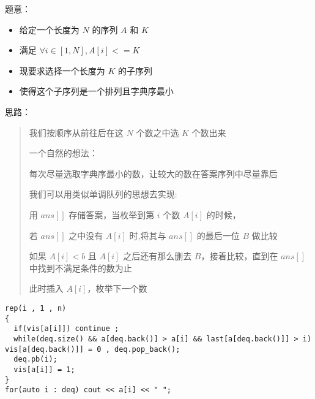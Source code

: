 \documentclass[E:/GsjzTle/main/main.tex]{subfiles}
\begin{document}
题意：
\begin{itemize}
\item
  给定一个长度为 \(N\) 的序列 \(A\) 和 \(K\)
\item
  满足 \(\forall i \in[1 , N],A[i] <= K\)
\item
  现要求选择一个长度为 \(K\) 的子序列
\item
  使得这个子序列是一个排列且字典序最小
\end{itemize}
思路：
\begin{quote}
我们按顺序从前往后在这 \(N\) 个数之中选 \(K\) 个数出来

一个自然的想法：

每次尽量选取字典序最小的数，让较大的数在答案序列中尽量靠后

我们可以用类似单调队列的思想去实现:

用 \(ans[]\) 存储答案，当枚举到第 \(i\) 个数 \(A[i]\) 的时候，

若 \(ans[]\) 之中没有 \(A[i]\) 时,将其与 \(ans[]\) 的最后一位 \(B\)
做比较

如果 \(A[i] < b\) 且 \(A[i]\) 之后还有那么删去 \(B\)，接着比较，直到在
\(ans[]\) 中找到不满足条件的数为止

此时插入 \(A[i]\)，枚举下一个数
\end{quote}

\begin{lstlisting}
rep(i , 1 , n) 
{
  if(vis[a[i]]) continue ;
  while(deq.size() && a[deq.back()] > a[i] && last[a[deq.back()]] > i) vis[a[deq.back()]] = 0 , deq.pop_back();   
  deq.pb(i);
  vis[a[i]] = 1;	
}
for(auto i : deq) cout << a[i] << " ";
\end{lstlisting}
\end{document}

